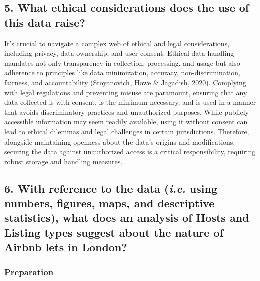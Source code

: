 \documentclass[
  letterpaper,
  DIV=11,
  numbers=noendperiod]{scrartcl}
\begin{document}
\hypertarget{what-ethical-considerations-does-the-use-of-this-data-raise}{%
\subsection{5. What ethical considerations does the use of this data
raise?}\label{what-ethical-considerations-does-the-use-of-this-data-raise}}

It's crucial to navigate a complex web of ethical and legal
considerations, including privacy, data ownership, and user consent.
Ethical data handling mandates not only transparency in collection,
processing, and usage but also adherence to principles like data
minimization, accuracy, non-discrimination, fairness, and accountability
(Stoyanovich, Howe \& Jagadish, 2020). Complying with legal regulations
and preventing misuse are paramount, ensuring that any data collected is
with consent, is the minimum necessary, and is used in a manner that
avoids discriminatory practices and unauthorized purposes. While
publicly accessible information may seem readily available, using it
without consent can lead to ethical dilemmas and legal challenges in
certain jurisdictions. Therefore, alongside maintaining openness about
the data's origins and modifications, securing the data against
unauthorized access is a critical responsibility, requiring robust
storage and handling measures.

\hypertarget{with-reference-to-the-data-i.e.-using-numbers-figures-maps-and-descriptive-statistics-what-does-an-analysis-of-hosts-and-listing-types-suggest-about-the-nature-of-airbnb-lets-in-london}{%
\subsection{\texorpdfstring{6. With reference to the data (\emph{i.e.}
using numbers, figures, maps, and descriptive statistics), what does an
analysis of Hosts and Listing types suggest about the nature of Airbnb
lets in
London?}{6. With reference to the data (i.e. using numbers, figures, maps, and descriptive statistics), what does an analysis of Hosts and Listing types suggest about the nature of Airbnb lets in London?}}\label{with-reference-to-the-data-i.e.-using-numbers-figures-maps-and-descriptive-statistics-what-does-an-analysis-of-hosts-and-listing-types-suggest-about-the-nature-of-airbnb-lets-in-london}}

\hypertarget{preparation}{%
\subsubsection{Preparation}\label{preparation}}
\end{document}
